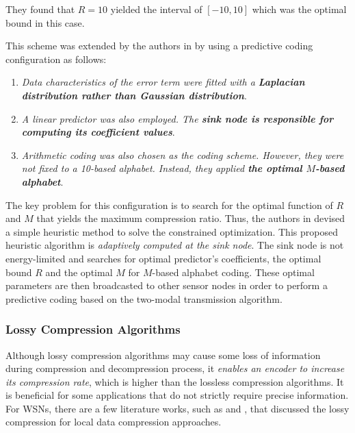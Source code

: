 \begin{enumerate}
        They found that $R=10$ yielded the interval of $\left[ -10,10 \right]$ which was the optimal bound in this case. 

        This scheme was extended by the authors in \cite{Liang2010} by using a predictive coding configuration as follows: 
        \begin{enumerate}
            \item \emph{\textcolor[rgb]{1,0,0}{Data characteristics of the error term were fitted with a \textbf{Laplacian distribution rather than Gaussian distribution}}}.
            \item \emph{\textcolor[rgb]{1,0,0}{A linear predictor was also employed. The \textbf{sink node is responsible for computing its coefficient values}}}.
            \item \emph{\textcolor[rgb]{1,0,0}{Arithmetic coding was also chosen as the coding scheme. However, they were not fixed to a 10-based alphabet. Instead, they applied \textbf{the optimal $M$-based alphabet}}}.
        \end{enumerate}
        The key problem for this configuration is to \textcolor[rgb]{1,0,0}{search for the optimal function of $R$ and $M$ that yields the maximum compression ratio}. Thus, the authors in \cite{Liang2010} devised a simple heuristic method to solve the constrained optimization. This proposed heuristic algorithm is \emph{\textcolor[rgb]{1,0,0}{adaptively computed at the sink node}}. The sink node is not energy-limited and searches for optimal predictor's coefficients, the optimal bound $R$ and the optimal $M$ for $M$-based alphabet coding. These optimal parameters are then broadcasted to other sensor nodes in order to perform a predictive coding based on the two-modal transmission algorithm.
\end{enumerate}


\subsubsection{Lossy Compression Algorithms}

Although lossy compression algorithms may cause some loss of information during compression and decompression process, it \emph{\textcolor[rgb]{1,0,0}{enables an encoder to increase its compression rate}}, which is higher than the lossless compression algorithms. It is beneficial for some applications that do not strictly require precise information. For WSNs, there are a few literature works, such as \cite{Schoellhammer2004} and \cite{Marcelloni:2010aa}, that discussed the lossy compression for \textcolor[rgb]{1,0,0}{local data compression approaches}.



